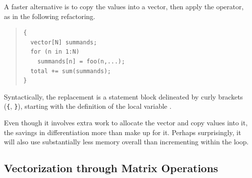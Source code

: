 A faster alternative is to copy the values into a vector, then
apply the  operator, as in the following refactoring.
%
\begin{quote}
\begin{Verbatim}
{  
  vector[N] summands;
  for (n in 1:N) 
    summands[n] = foo(n,...);
  total += sum(summands);
}
\end{Verbatim}
\end{quote}
%
Syntactically, the replacement is a statement block delineated
by curly brackets (\Verb|{|, \Verb|}|), starting with the definition
of the local variable .

Even though it involves extra work to allocate the 
vector and copy  values into it, the savings in
differentiation more than make up for it.  Perhaps surprisingly,
it will also use substantially less memory overall than incrementing
 within the loop.


\subsection{Vectorization through Matrix Operations}

